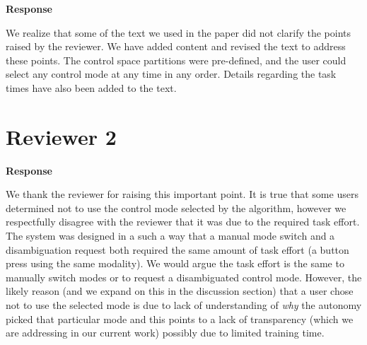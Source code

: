 \documentclass[a4paper,twoside,11pt]{reviewresponse}
\begin{document}
\textbf{Response}

We realize that some of the text we used in the paper did not clarify the points raised by the reviewer. We have added content and revised the text to address these points. The control space partitions were pre-defined, and the user could select any control mode at any time in any order. Details regarding the task times have also been added to the text. 

\clearpage

\section{Reviewer 2}


\textbf{Response}

We thank the reviewer for raising this important point. It is true that some users determined not to use the control mode selected by the algorithm, however we respectfully disagree with the reviewer that it was due to the required task effort. The system was designed in a such a way that a manual mode switch and a disambiguation request both required the same amount of task effort (a button press using the same modality). We would argue the task effort is the same to manually switch modes or to request a disambiguated control mode. However, the likely reason (and we expand on this in the discussion section) that a user chose not to use the selected mode is due to lack of understanding of \textit{why} the autonomy picked that particular mode and this points to a lack of transparency (which we are addressing in our current work) possibly due to limited training time. 
\end{document}
